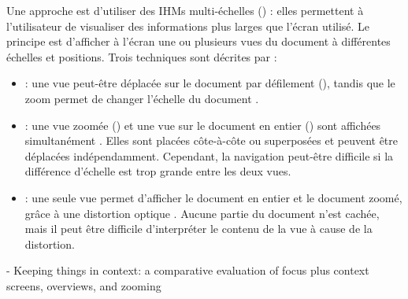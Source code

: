 Une approche est d'utiliser des IHMs multi-échelles () : elles permettent à l'utilisateur de visualiser des informations plus larges que l'écran utilisé. Le principe est d'afficher à l'écran une ou plusieurs vues du document à différentes échelles et positions. Trois techniques sont décrites par \cite{Guiard2004} :
\begin{itemize}
  \item {} : une vue peut-être déplacée sur le document par défilement (), tandis que le zoom permet de changer l'échelle du document .
  \item {} : une vue zoomée () et une vue sur le document en entier () sont affichées simultanément . Elles sont placées côte-à-côte ou superposées et peuvent être déplacées indépendamment. Cependant, la navigation peut-être difficile si la différence d'échelle est trop grande entre les deux vues.
  \item {} : une seule vue permet d'afficher le document en entier et le document zoomé, grâce à une distortion optique . Aucune partie du document n'est cachée, mais il peut être difficile d'interpréter le contenu de la vue à cause de la distortion.
\end{itemize}


\cite{Baudisch2002} - Keeping things in context: a comparative evaluation of focus plus context screens, overviews, and zooming


